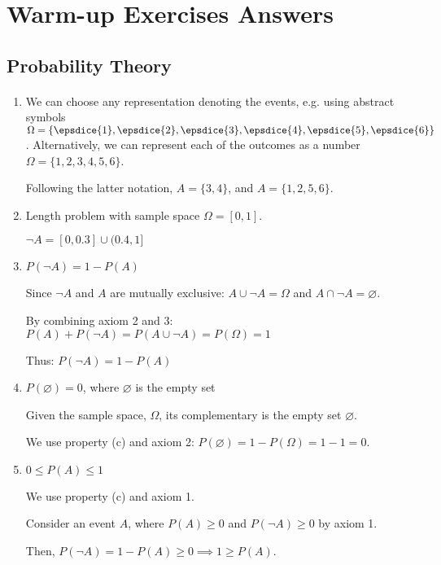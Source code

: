 \section{Warm-up Exercises Answers}
\subsection{Probability Theory}
\paragraph{}
\begin{enumerate}[label=\alph*.]
    \item We can choose any representation denoting the events, e.g. using abstract symbols $\Omega=\{ \epsdice{1}, \epsdice{2}, \epsdice{3}, \epsdice{4}, \epsdice{5}, \epsdice{6} \}$. Alternatively, we can represent each of the outcomes as a number $\Omega = \{1, 2, 3, 4, 5, 6\}$.
    
    Following the latter notation, $A=\{3, 4\}$, and $A=\{1, 2, 5, 6\}$.

	    
    
	\item Length problem with sample space $\Omega=[0,1]$.
	
	$\neg A = [0, 0.3] \cup (0.4,1]$
    
    \item $P(\neg  A) = 1 - P(A)$
    
    Since $\neg A$ and $A$ are mutually exclusive: $A \cup \neg A = \Omega$ and $A \cap \neg A = \varnothing$.

By combining axiom 2 and 3: $P(A) + P(\neg A) = P(A \cup \neg A) = P(\Omega) = 1$

Thus: $P(\neg A) = 1 - P(A)$ 

    \item $P(\varnothing) = 0$, where $\varnothing$ is the empty set
    
Given the sample space, $\Omega$, its complementary is the empty set $\varnothing$. 

We use property (c) and axiom 2: $ P(\varnothing) = 1 - P(\Omega) = 1 - 1 = 0$.

    \item $0 \leq P(A) \leq 1$
    
We use property (c) and axiom 1. 

Consider an event $A$, where $P(A) \geq 0$ and $P(\neg A) \geq 0$ by axiom 1. 

Then, $P(\neg A) = 1 - P(A) \geq 0 \implies 1 \geq P(A)$.


\end{enumerate}
